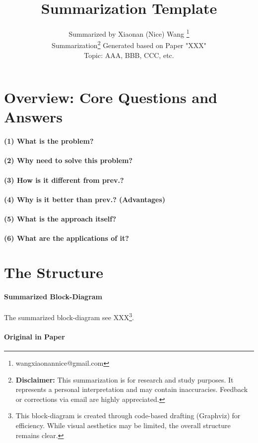\documentclass{article}
\title{Summarization Template}
\author{
  Summarized by Xiaonan (Nice) Wang \thanks{wangxiaonannice@gmail.com} \\
  Summarization\thanks{\textbf{Disclaimer:} This summarization is for research and study purposes. It represents a personal interpretation and may contain inaccuracies. Feedback or corrections via email are highly appreciated.} Generated based on Paper "XXX" \\
  Topic: AAA, BBB, CCC, etc. \\
}
\begin{document}
\maketitle

\begin{abstract}
\end{abstract}

\section{Overview: Core Questions and Answers}

\paragraph{(1) What is the problem?} 

\paragraph{(2) Why need to solve this problem?} 

\paragraph{(3) How is it different from prev.?} 

\paragraph{(4) Why is it better than prev.? (Advantages)} 

\paragraph{(5) What is the approach itself?} 

\paragraph{(6) What are the applications of it?} 

\section{The Structure}

\paragraph{Summarized Block-Diagram} 
The summarized block-diagram see XXX\footnote{This block-diagram is created through code-based drafting (Graphviz) for efficiency. While visual aesthetics may be limited, the overall structure remains clear.}.

\paragraph{Original in Paper}



\end{document}
